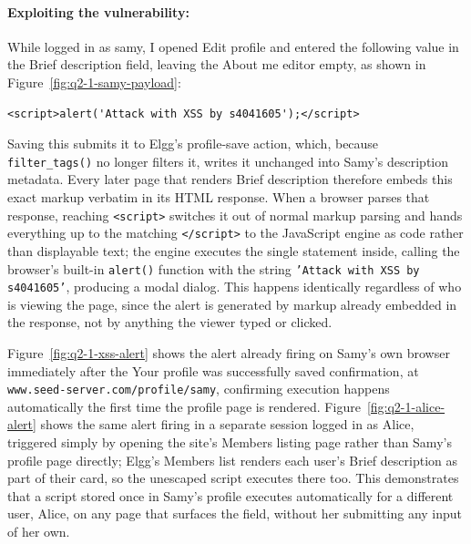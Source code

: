 \paragraph{Exploiting the vulnerability:} While logged in as samy, I opened Edit profile and entered the following value in the Brief description field, leaving the About me editor empty, as shown in Figure~\ref{fig:q2-1-samy-payload}:

\begin{lstlisting}
<script>alert('Attack with XSS by s4041605');</script>
\end{lstlisting}

Saving this submits it to Elgg's profile-save action, which, because \texttt{filter\_tags()} no longer filters it, writes it unchanged into Samy's description metadata. Every later page that renders Brief description therefore embeds this exact markup verbatim in its HTML response. When a browser parses that response, reaching \texttt{<script>} switches it out of normal markup parsing and hands everything up to the matching \texttt{</script>} to the JavaScript engine as code rather than displayable text; the engine executes the single statement inside, calling the browser's built-in \texttt{alert()} function with the string \texttt{'Attack with XSS by s4041605'}, producing a modal dialog. This happens identically regardless of who is viewing the page, since the alert is generated by markup already embedded in the response, not by anything the viewer typed or clicked.

Figure~\ref{fig:q2-1-xss-alert} shows the alert already firing on Samy's own browser immediately after the \textquotedbl{}Your profile was successfully saved\textquotedbl{} confirmation, at \texttt{www.seed-server.com/profile/samy}, confirming execution happens automatically the first time the profile page is rendered. Figure~\ref{fig:q2-1-alice-alert} shows the same alert firing in a separate session logged in as Alice, triggered simply by opening the site's Members listing page rather than Samy's profile page directly; Elgg's Members list renders each user's Brief description as part of their card, so the unescaped script executes there too. This demonstrates that a script stored once in Samy's profile executes automatically for a different user, Alice, on any page that surfaces the field, without her submitting any input of her own.



